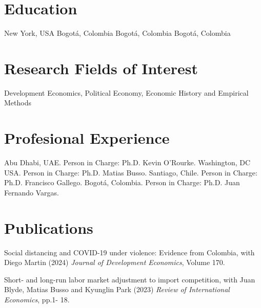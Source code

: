 \documentclass{moderncv}
\begin{document}
\maketitle
\section{\textbf{Education}}
 {New York, USA}{}{}
 {Bogot\'a, Colombia}{}{}
 {Bogot\'a, Colombia}{}{}
 {Bogot\'a, Colombia}{}{}

\section{\textbf{Research Fields of Interest}}
{Development Economics,  Political Economy,  Economic History and Empirical Methods }

\section{\textbf{Profesional Experience}}
 {}{}{Abu Dhabi, UAE. Person in Charge: Ph.D. Kevin O'Rourke.}
 {}{}{Washington, DC USA. Person in Charge: Ph.D. Matias Busso.}
 {}{}{Santiago, Chile. Person in Charge: Ph.D. Francisco Gallego.}
 {}{}{Bogot\'a, Colombia. Person in Charge: Ph.D. Juan Fernando Vargas.}

\section{\textbf{Publications}}

{Social distancing and COVID-19 under violence: Evidence from Colombia, with Diego Martin (2024) \emph{Journal of Development Economics}, Volume 170. \\}

{Short- and long-run labor market adjustment to import competition, with Juan Blyde, Matias Busso and Kyunglin Park (2023) \emph{Review of International Economics}, pp.1- 18. \\}
\end{document}

